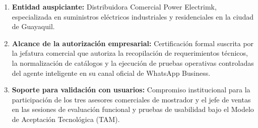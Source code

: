 \begin{enumerate}
    \item \textbf{Entidad auspiciante:} Distribuidora Comercial Power Electrimk, especializada en suministros eléctricos industriales y residenciales en la ciudad de Guayaquil.
    \item \textbf{Alcance de la autorización empresarial:} Certificación formal suscrita por la jefatura comercial que autoriza la recopilación de requerimientos técnicos, la normalización de catálogos y la ejecución de pruebas operativas controladas del agente inteligente en su canal oficial de WhatsApp Business.
    \item \textbf{Soporte para validación con usuarios:} Compromiso institucional para la participación de los tres asesores comerciales de mostrador y el jefe de ventas en las sesiones de evaluación funcional y pruebas de usabilidad bajo el Modelo de Aceptación Tecnológica (TAM).
\end{enumerate}

\vspace{0.4cm}
\begin{center}
\end{center}
